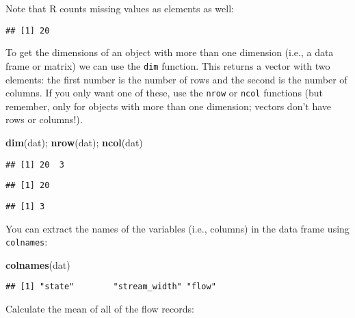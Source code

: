 \documentclass[]{book}
\newenvironment{Shaded}{\begin{snugshade}}{\end{snugshade}}
\newcommand{\KeywordTok}[1]{\textcolor[rgb]{0.13,0.29,0.53}{\textbf{#1}}}
\newcommand{\OperatorTok}[1]{\textcolor[rgb]{0.81,0.36,0.00}{\textbf{#1}}}
\newcommand{\NormalTok}[1]{#1}
\theoremstyle{definition}
\theoremstyle{definition}
\theoremstyle{definition}
\theoremstyle{remark}
\begin{document}
Note that R counts missing values as elements as well:

\begin{Shaded}
\end{Shaded}

\begin{verbatim}
## [1] 20
\end{verbatim}

To get the dimensions of an object with more than one dimension (i.e., a
data frame or matrix) we can use the \texttt{dim} function. This returns
a vector with two elements: the first number is the number of rows and
the second is the number of columns. If you only want one of these, use
the \texttt{nrow} or \texttt{ncol} functions (but remember, only for
objects with more than one dimension; vectors don't have rows or
columns!).

\begin{Shaded}
\begin{Highlighting}[]
\KeywordTok{dim}\NormalTok{(dat); }\KeywordTok{nrow}\NormalTok{(dat); }\KeywordTok{ncol}\NormalTok{(dat)}
\end{Highlighting}
\end{Shaded}

\begin{verbatim}
## [1] 20  3
\end{verbatim}

\begin{verbatim}
## [1] 20
\end{verbatim}

\begin{verbatim}
## [1] 3
\end{verbatim}

You can extract the names of the variables (i.e., columns) in the data
frame using \texttt{colnames}:

\begin{Shaded}
\begin{Highlighting}[]
\KeywordTok{colnames}\NormalTok{(dat)}
\end{Highlighting}
\end{Shaded}

\begin{verbatim}
## [1] "state"        "stream_width" "flow"
\end{verbatim}

Calculate the mean of all of the flow records:
\end{document}
